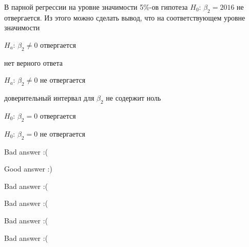 
\begin{question}
В парной регрессии на уровне значимости 5\%-ов гипотеза \(H_0\): \(\beta_2 = 2016\) не отвергается.
Из этого можно сделать вывод, что на соответствующем уровне значимости
\begin{answerlist}
  \item \(H_a\): \(\beta_2 \neq 0\) отвергается
  \item нет верного ответа
  \item \(H_a\): \(\beta_2 \neq 0\) не отвергается
  \item доверительный интервал для \(\beta_2\) не содержит ноль
  \item \(H_0\): \(\beta_2 = 0\) отвергается
  \item \(H_0\): \(\beta_2 = 0\) не отвергается
\end{answerlist}
\end{question}

\begin{solution}
\begin{answerlist}
  \item Bad answer :(
  \item Good answer :)
  \item Bad answer :(
  \item Bad answer :(
  \item Bad answer :(
  \item Bad answer :(
\end{answerlist}
\end{solution}

